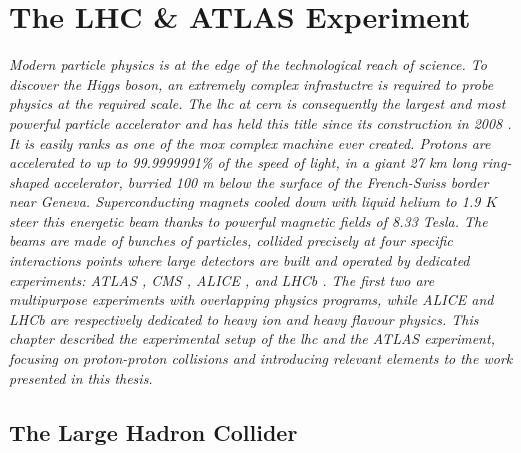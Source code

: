 \chapter{\color{oxfordblue} The LHC \& ATLAS Experiment}\label{chapter-ATLAS}
\ChapFrame

\textit{
Modern particle physics is at the edge of the technological reach of science. To discover the Higgs boson, an extremely complex infrastuctre is required to probe physics at the required scale. The \gls{lhc} at \gls{cern} is consequently the largest and most powerful particle accelerator and has held this title since its construction in 2008 \cite{LyndonEvans_2008}. It is easily ranks as one of the mox complex machine ever created. Protons are accelerated to up to 99.9999991\% of the speed of light, in a giant 27 km long ring-shaped accelerator, burried 100 m below the surface of the French-Swiss border near Geneva. Superconducting magnets cooled down with liquid helium to 1.9 $K$ steer this energetic beam thanks to powerful magnetic fields of 8.33 Tesla. The beams are made of bunches of particles, collided precisely at four specific interactions points where large detectors are built and operated by dedicated experiments: ATLAS \cite{TheATLASCollaboration_2008}, CMS \cite{TheCMSCollaboration_2008}, ALICE \cite{TheALICECollaboration_2008}, and LHCb \cite{TheLHCbCollaboration_2008}. The first two are multipurpose experiments with overlapping physics programs, while ALICE and LHCb are respectively dedicated to heavy ion and heavy flavour physics. This chapter described the experimental setup of the \gls{lhc} and the ATLAS experiment, focusing on proton-proton collisions and introducing relevant elements to the work presented in this thesis.} 

\section{The Large Hadron Collider}\label{sec-LHC} %

